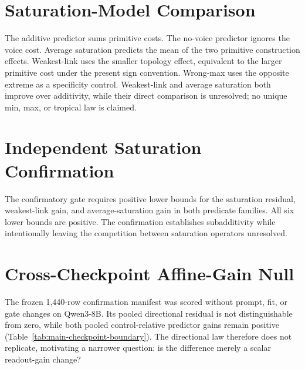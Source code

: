 \section{Saturation-Model Comparison}



The additive predictor sums primitive costs. The no-voice predictor ignores the
voice cost. Average saturation predicts the mean of the two primitive
construction effects. Weakest-link uses the smaller topology effect, equivalent
to the larger primitive cost under the present sign convention. Wrong-max uses
the opposite extreme as a specificity control. Weakest-link and average
saturation both improve over additivity, while their direct comparison is
unresolved; no unique min, max, or tropical law is claimed.

\section{Independent Saturation Confirmation}



The confirmatory gate requires positive lower bounds for the saturation
residual, weakest-link gain, and average-saturation gain in both predicate
families. All six lower bounds are positive. The confirmation establishes
subadditivity while intentionally leaving the competition between saturation
operators unresolved.

\section{Cross-Checkpoint Affine-Gain Null}

The frozen 1,440-row confirmation manifest was scored without prompt, fit, or
gate changes on Qwen3-8B. Its pooled directional residual is not distinguishable
from zero, while both pooled control-relative predictor gains remain positive
(Table~\ref{tab:main-checkpoint-boundary}). The directional law therefore does not
replicate, motivating a narrower question: is the difference merely a scalar
readout-gain change?



